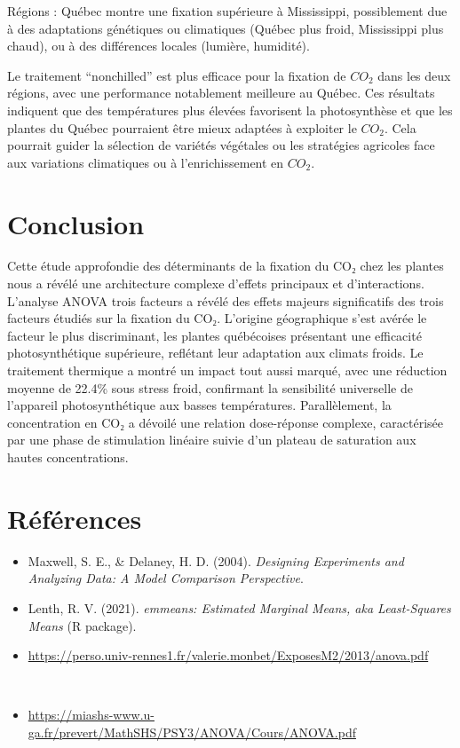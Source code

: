 \documentclass[
]{article}
\providecommand{\tightlist}{%
  \setlength{\itemsep}{0pt}\setlength{\parskip}{0pt}}
\begin{document}
Régions : Québec montre une fixation supérieure à Mississippi,
possiblement due à des adaptations génétiques ou climatiques (Québec
plus froid, Mississippi plus chaud), ou à des différences locales
(lumière, humidité).

Le traitement ``nonchilled'' est plus efficace pour la fixation de
\(CO_2\) dans les deux régions, avec une performance notablement
meilleure au Québec. Ces résultats indiquent que des températures plus
élevées favorisent la photosynthèse et que les plantes du Québec
pourraient être mieux adaptées à exploiter le \(CO_2\). Cela pourrait
guider la sélection de variétés végétales ou les stratégies agricoles
face aux variations climatiques ou à l'enrichissement en \(CO_2\).

\section{Conclusion}\label{conclusion}

Cette étude approfondie des déterminants de la fixation du CO₂ chez les
plantes nous a révélé une architecture complexe d'effets principaux et
d'interactions. L'analyse ANOVA trois facteurs a révélé des effets
majeurs significatifs des trois facteurs étudiés sur la fixation du CO₂.
L'origine géographique s'est avérée le facteur le plus discriminant, les
plantes québécoises présentant une efficacité photosynthétique
supérieure, reflétant leur adaptation aux climats froids. Le traitement
thermique a montré un impact tout aussi marqué, avec une réduction
moyenne de 22.4\% sous stress froid, confirmant la sensibilité
universelle de l'appareil photosynthétique aux basses températures.
Parallèlement, la concentration en CO₂ a dévoilé une relation
dose-réponse complexe, caractérisée par une phase de stimulation
linéaire suivie d'un plateau de saturation aux hautes concentrations.

\section{Références}\label{ruxe9fuxe9rences}

\begin{itemize}
\tightlist
\item
  Maxwell, S. E., \& Delaney, H. D. (2004). \emph{Designing Experiments
  and Analyzing Data: A Model Comparison Perspective}.
\item
  Lenth, R. V. (2021). \emph{emmeans: Estimated Marginal Means, aka
  Least-Squares Means} (R package).
\item
  \url{https://perso.univ-rennes1.fr/valerie.monbet/ExposesM2/2013/anova.pdf}\strut \\
\item
  \url{https://miashs-www.u-ga.fr/prevert/MathSHS/PSY3/ANOVA/Cours/ANOVA.pdf}
\end{itemize}
\end{document}
